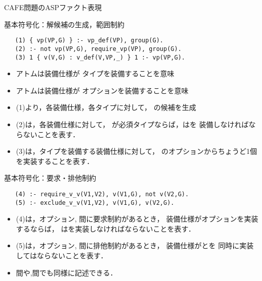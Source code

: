 \documentclass[dvipdfmx, 11pt]{beamer}
\begin{document}
\begin{frame}{CAFE問題のASPファクト表現}
  \begin{multicols}{2}
   \scriptsize
   
  \end{multicols}
\end{frame}
\begin{frame}[fragile]{基本符号化：解候補の生成，範囲制約}
 \begin{exampleblock}{}
  \begin{lstlisting}
   (1) { vp(VP,G) } :- vp_def(VP), group(G). 
   (2) :- not vp(VP,G), require_vp(VP), group(G).
   (3) 1 { v(V,G) : v_def(V,VP,_) } 1 :- vp(VP,G).
  \end{lstlisting}
 \end{exampleblock}
 \begin{itemize}
  \item アトムは装備仕様が
   	タイプを装備することを意味
  \item アトムは装備仕様が
	オプションを装備することを意味
  \item (1)より，各装備仕様，各タイプに対して，
	の候補を生成
  \item (2)は，各装備仕様に対して，
	が必須タイプならば，はを
	装備しなければならないことを表す．
  \item (3)は，タイプを装備する装備仕様に対して，
	のオプションからちょうど1個を実装することを表す．
  \end{itemize}
\end{frame}
\begin{frame}[fragile]{基本符号化：要求・排他制約}
 \begin{exampleblock}{}
  \begin{lstlisting}
   (4) :- require_v_v(V1,V2), v(V1,G), not v(V2,G).
   (5) :- exclude_v_v(V1,V2), v(V1,G), v(V2,G).
  \end{lstlisting}
 \end{exampleblock}
 \begin{itemize}
  \item (4)は，オプション, 間に要求制約があるとき，
	装備仕様がオプションを実装するならば，
	はを実装しなければならないことを表す．
  \item (5)は，オプション, 間に排他制約があるとき，
	装備仕様がとを
	同時に実装してはならないことを表す．
  \item {}間や,間でも同様に記述できる．
 \end{itemize}
\end{frame}
\end{document}

